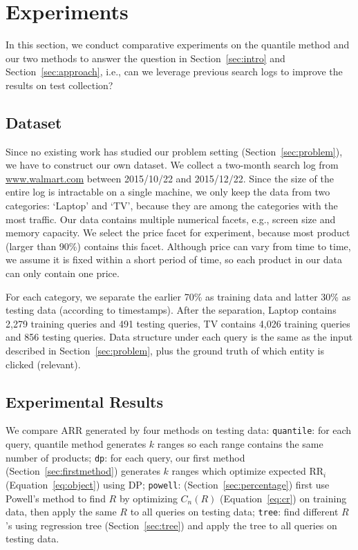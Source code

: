 
\section{Experiments}
\label{sec:exp}

In this section, we conduct comparative experiments on the quantile method and our two methods to answer the question in Section~\ref{sec:intro} and Section~\ref{sec:approach}, i.e., can we leverage previous search logs to improve the results on test collection?

\subsection{Dataset}
\label{sec:data}

Since no existing work has studied our problem setting (Section~\ref{sec:problem}), we have to construct our own dataset. We collect a two-month search log from \url{www.walmart.com} between 2015/10/22 and 2015/12/22. Since the size of the entire log is intractable on a single machine, we only keep the data from two categories: `Laptop' and `TV', because they are among the categories with the most traffic. Our data contains multiple numerical facets, e.g., screen size and memory capacity. We select the price facet for experiment, because most product (larger than 90\%) contains this facet. Although price can vary from time to time, we assume it is fixed within a short period of time, so each product in our data can only contain one price. 

For each category, we separate the earlier 70\% as training data and latter 30\% as testing data (according to timestamps). After the separation, Laptop contains 2,279 training queries and 491 testing queries, TV contains 4,026 training queries and 856 testing queries. Data structure under each query is the same as the input described in Section~\ref{sec:problem}, plus the ground truth of which entity is clicked (relevant). 

\subsection{Experimental Results}
We compare ARR generated by four methods on testing data: \texttt{quantile}: for each query, quantile method generates $k$ ranges so each range contains the same number of products; \texttt{dp}: for each query, our first method (Section~\ref{sec:firstmethod}) generates $k$ ranges which optimize expected RR$_i$ (Equation~\ref{eq:object}) using DP; \texttt{powell}: (Section~\ref{sec:percentage}) first use Powell's method to find $R$ by optimizing $C_n(R)$ (Equation~\ref{eq:cr}) on training data, then apply the same $R$ to all queries on testing data; \texttt{tree}: find different $R$'s using regression tree (Section~\ref{sec:tree}) and apply the tree to all queries on testing data. 


